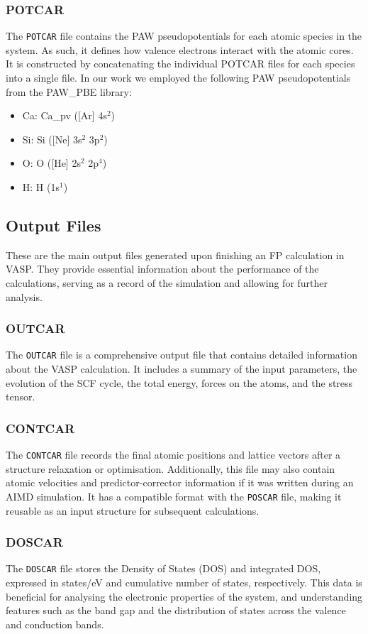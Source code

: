 \subsubsection{POTCAR}
The \texttt{POTCAR} file contains the PAW pseudopotentials for each atomic species in the system. As such, it defines how valence electrons interact with the atomic cores. It is constructed by concatenating the individual POTCAR files for each species into a single file. In our work we employed the following PAW pseudopotentials from the PAW\_PBE library:
\begin{itemize}
    \item Ca: Ca\_pv ([Ar] 4s$^2$)
    \item Si: Si ([Ne] 3s$^2$ 3p$^2$)
    \item O: O ([He] 2s$^2$ 2p$^4$)
    \item H: H (1s$^1$)
\end{itemize}

\subsection{Output Files}
These are the main output files generated upon finishing an FP calculation in VASP. They provide essential information about the performance of the calculations, serving as a record of the simulation and allowing for further analysis.
\subsubsection{OUTCAR}
The \texttt{OUTCAR} file is a comprehensive output file that contains detailed information about the VASP calculation. It includes a summary of the input parameters, the evolution of the SCF cycle, the total energy, forces on the atoms, and the stress tensor.
\subsubsection{CONTCAR}
The \texttt{CONTCAR} file records the final atomic positions and lattice vectors after a structure relaxation or optimisation. Additionally, this file may also contain atomic velocities and predictor-corrector information if it was written during an AIMD simulation. It has a compatible format with the \texttt{POSCAR} file, making it reusable as an input structure for subsequent calculations.

\subsubsection{DOSCAR}
The \texttt{DOSCAR} file stores the Density of States (DOS) and integrated DOS, expressed in states/eV and cumulative number of states, respectively. This data is beneficial for analysing the electronic properties of the system, and understanding features such as the band gap and the distribution of states across the valence and conduction bands. 
